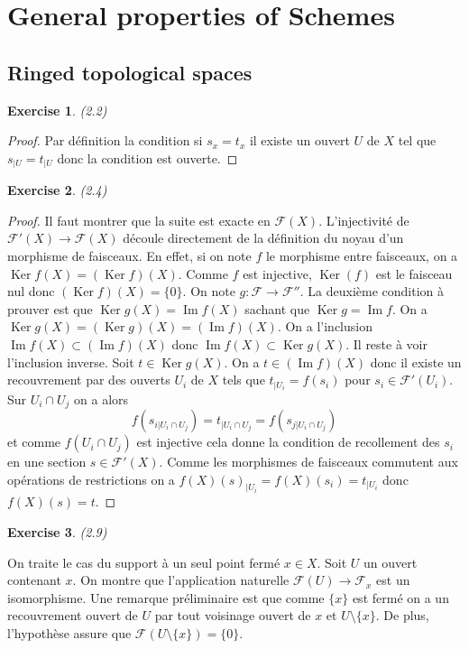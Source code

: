 \documentclass[A4, 11pt]{article}
\newtheorem{exer}{Exercise}
\def\Ker{  \operatorname{Ker} }
\def\Im{  \operatorname{Im} }
\begin{document}
\section{General properties of Schemes}
\subsection{Ringed topological spaces}
\begin{exer}(2.2)
\end{exer}
\begin{proof}
Par définition la condition si $s_x=t_x$ il existe un ouvert $U$ de $X$ tel que $s_{|U}=t_{|U}$ donc la condition est ouverte.
\end{proof}
\begin{exer}(2.4)
\end{exer}
\begin{proof}
Il faut montrer que la suite est exacte en $\mathcal{F}(X)$. L'injectivité de $\mathcal{F'}(X)\rightarrow \mathcal{F}(X)$ découle directement de la définition du noyau d'un morphisme de faisceaux. En effet, si on note $f$ le morphisme entre faisceaux, on a $\Ker f(X)=(\Ker f) (X)$. Comme $f$ est injective, $\Ker (f)$ est le faisceau nul donc $(\Ker f)(X)=\{0\}$.
On note $g\colon \mathcal{F}\rightarrow \mathcal{F''}$. La deuxième condition à prouver est que $\Ker g(X)=\Im f(X)$ sachant que $\Ker g=\Im f$. On a $\Ker g(X)=(\Ker g)(X)=(\Im f)(X)$. On a l'inclusion $\Im f(X)\subset (\Im f)(X)$ donc $\Im f(X) \subset \Ker g(X)$. Il reste à voir l'inclusion inverse. Soit $t\in \Ker g(X)$. On a $t\in (\Im f)(X)$ donc il existe un recouvrement par des ouverts $U_i$ de $X$ tels que $t_{|U_i}=f(s_i)$ pour $s_i\in \mathcal{F'}(U_i)$. Sur $U_i\cap U_j$ on a alors 
$$f(s_{i|U_i\cap U_j})=t_{|U_i\cap U_j}=f(s_{j|U_i\cap U_j})$$
et comme $f(U_i\cap U_j)$ est injective cela donne la condition de recollement des $s_i$ en une section $s\in \mathcal{F'}(X)$. Comme les morphismes de faisceaux commutent aux opérations de restrictions on a $f(X)(s)_{|U_i}=f(X)(s_i)=t_{|U_i}$ donc $f(X)(s)=t$. 
\end{proof}
\begin{exer}(2.9)
\end{exer}
On traite le cas du support à un seul point fermé $x\in X$. Soit $U$ un ouvert contenant $x$. On montre que l'application naturelle $\mathcal{F}(U)\rightarrow \mathcal{F}_x$ est un isomorphisme. Une remarque préliminaire est que comme $\{x\}$ est fermé on a un recouvrement ouvert de $U$ par tout voisinage ouvert de $x$ et $U\setminus \{x\}$. De plus, l'hypothèse assure que $\mathcal{F}(U\setminus\{x\})=\{0\}$. 
\end{document}
